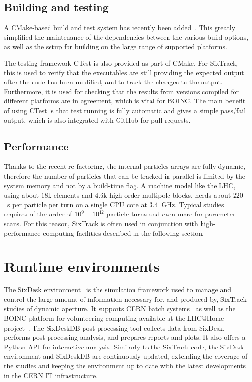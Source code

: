 \documentclass[a4paper,
              ]{jacow}
\begin{document}
\subsection{Building and testing}

A CMake-based build and test system has recently been added~\cite{recentDevels2}. This greatly simplified the maintenance of the dependencies between the various build options, as well as the setup for building on the large range of supported platforms.

The testing framework CTest is also provided as part of CMake. For SixTrack, this is used to verify that the executables are still providing the expected output after the code has been modified, and to track the changes to the output. Furthermore, it is used for checking that the results from versions compiled for different platforms are in agreement, which is vital for BOINC. The main benefit of using CTest is that test running is fully automatic and gives a simple pass/fail output, which is also integrated with GitHub for pull requests.

\subsection{Performance}

Thanks to the recent re-factoring, the internal particles arrays are fully dynamic, therefore the number of particles that can be tracked in parallel is limited by the system memory and not by a build-time flag. A machine model like the LHC, using about $18$k elements and $4.6$k high-order multipole blocks, needs about $220$~\textmu s per particle per turn on a single CPU core at 3.4~GHz. Typical studies requires of the order of $10^9 - 10^{12}$ particle turns and even more for parameter scans. For this reason, SixTrack is often used in conjunction with high-performance computing facilities described in the following section.

\section{Runtime environments}

The SixDesk environment~\cite{sixdesk} is the simulation framework used to manage and control the large amount of information necessary for, and produced by, SixTrack studies of dynamic aperture. It supports CERN batch systems~\cite{cernbatch} as well as the BOINC platform for volunteering computing available at the LHC@Home project~\cite{lhcathome}. The SixDeskDB post-processing tool collects data from SixDesk, performs post-processing analysis, and prepares reports and plots. It also offers a Python API for interactive analysis. Similarly to the SixTrack code, the SixDesk environment and SixDeskDB are continuously updated, extending the coverage of the studies and keeping the environment up to date with the latest developments in the CERN IT infrastructure.
\end{document}
